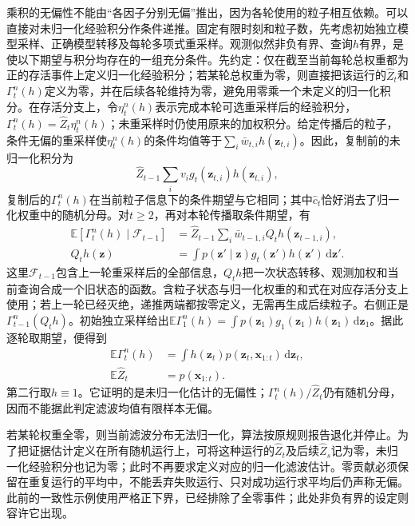 乘积的无偏性不能由“各因子分别无偏”推出，因为各轮使用的粒子相互依赖。可以直接对未归一化经验积分作条件递推。固定有限时刻和粒子数，先考虑初始独立模型采样、正确模型转移及每轮多项式重采样。观测似然非负有界、查询$h$有界，是使以下期望与积分均存在的一组充分条件。先约定：仅在截至当前每轮总权重都为正的存活事件上定义归一化经验积分；若某轮总权重为零，则直接把该运行的$\widehat Z_t$和$\Gamma_t^n(h)$定义为零，并在后续各轮维持为零，避免用零乘一个未定义的归一化积分。在存活分支上，令$\eta_t^n(h)$表示完成本轮可选重采样后的经验积分，$\Gamma_t^n(h)=\widehat Z_t\eta_t^n(h)$；未重采样时仍使用原来的加权积分。给定传播后的粒子，条件无偏的重采样使$\eta_t^n(h)$的条件均值等于$\sum_i\bar w_{t,i}h(\bm z_{t,i})$。因此，复制前的未归一化积分为
\[
  \widehat Z_{t-1}\sum_i v_i g_t(\bm z_{t,i})h(\bm z_{t,i}),
\]
复制后的$\Gamma_t^n(h)$在当前粒子信息下的条件期望与它相同；其中$\widehat c_t$恰好消去了归一化权重中的随机分母。对$t\geq2$，再对本轮传播取条件期望，有
\begin{equation}
  \begin{aligned}
    \mathbb E[\Gamma_t^n(h)\mid\mathcal F_{t-1}]
      &=\widehat Z_{t-1}\sum_i\bar w_{t-1,i}
          Q_t h(\bm z_{t-1,i}),\\
    Q_t h(\bm z)
      &=\int p(\bm z'\mid\bm z)g_t(\bm z')
                    h(\bm z')\,\mathrm d\bm z'.
  \end{aligned}
  \label{eq:pgm-sampling-evidence-recursion}
\end{equation}
这里$\mathcal F_{t-1}$包含上一轮重采样后的全部信息，$Q_t h$把一次状态转移、观测加权和当前查询合成一个旧状态的函数。含粒子状态与归一化权重的和式在对应存活分支上使用；若上一轮已经灭绝，递推两端都按零定义，无需再生成后续粒子。右侧正是$\Gamma_{t-1}^n(Q_t h)$。初始独立采样给出$\mathbb E\Gamma_1^n(h)=\int p(\bm z_1)g_1(\bm z_1)h(\bm z_1)\,\mathrm d\bm z_1$。据此逐轮取期望，便得到
\[
  \begin{aligned}
    \mathbb E\Gamma_t^n(h)
      &=\int h(\bm z_t)p(\bm z_t,\bm x_{1:t})\,\mathrm d\bm z_t,\\
    \mathbb E\widehat Z_t&=p(\bm x_{1:t}).
  \end{aligned}
\]
第二行取$h\equiv1$。它证明的是未归一化估计的无偏性；$\Gamma_t^n(h)/\widehat Z_t$仍有随机分母，因而不能据此判定滤波均值有限样本无偏。

若某轮权重全零，则当前滤波分布无法归一化，算法按原规则报告退化并停止。为了把证据估计定义在所有随机运行上，可将这种运行的$\widehat Z_t$及后续$\widehat Z_s$记为零，未归一化经验积分也记为零；此时不再要求定义对应的归一化滤波估计。零贡献必须保留在重复运行的平均中，不能丢弃失败运行、只对成功运行求平均后仍声称无偏。此前的一致性示例使用严格正下界，已经排除了全零事件；此处非负有界的设定则容许它出现。

